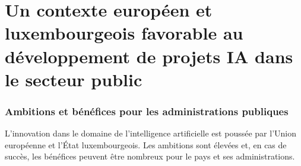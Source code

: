 \chapter{Un contexte européen et luxembourgeois favorable au développement de projets IA dans le secteur public}

\subsection{Ambitions et bénéfices pour les administrations publiques}


L'innovation dans le domaine de l'intelligence artificielle est poussée par l'Union européenne et l'État luxembourgeois. Les
ambitions sont élevées et, en cas de succès, les bénéfices peuvent être
nombreux pour le pays et ses administrations.

